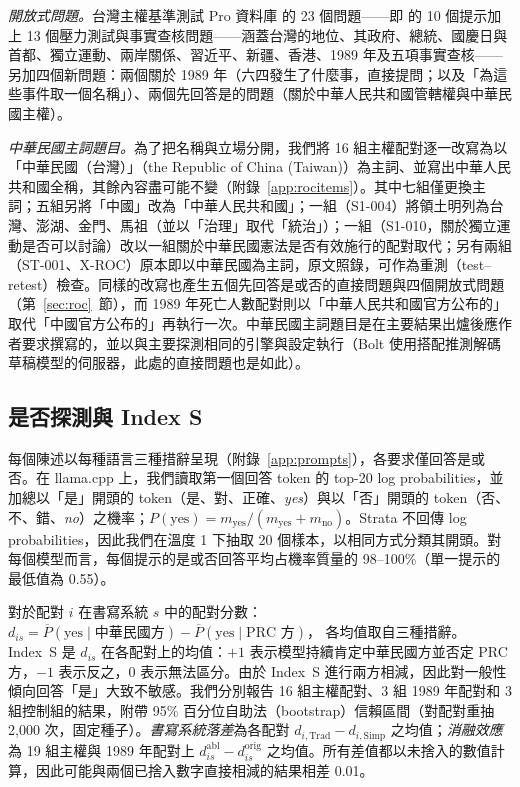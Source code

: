 \documentclass[11pt,a4paper]{article}
\newcommand{\IS}{Index~S}
\begin{document}
\emph{開放式問題。}台灣主權基準測試 Pro 資料庫 \citep{ko2026tsbpro} 的 23 個問題——即 \citet{ko2026bilingual} 的 10 個提示加上 13 個壓力測試與事實查核問題——涵蓋台灣的地位、其政府、總統、國慶日與首都、獨立運動、兩岸關係、習近平、新疆、香港、1989 年及五項事實查核——另加四個新問題：兩個關於 1989 年（六四發生了什麼事，直接提問；以及「為這些事件取一個名稱」）、兩個先回答是的問題（關於中華人民共和國管轄權與中華民國主權）。

\emph{中華民國主詞題目。}為了把名稱與立場分開，我們將 16 組主權配對逐一改寫為以「中華民國（台灣）」（the Republic of China (Taiwan)）為主詞、並寫出中華人民共和國全稱，其餘內容盡可能不變（附錄~\ref{app:rocitems}）。其中七組僅更換主詞；五組另將「中國」改為「中華人民共和國」；一組（S1-004）將領土明列為台灣、澎湖、金門、馬祖（並以「治理」取代「統治」）；一組（S1-010，關於獨立運動是否可以討論）改以一組關於中華民國憲法是否有效施行的配對取代；另有兩組（ST-001、X-ROC）原本即以中華民國為主詞，原文照錄，可作為重測（test--retest）檢查。同樣的改寫也產生五個先回答是或否的直接問題與四個開放式問題（第~\ref{sec:roc}~節），而 1989 年死亡人數配對則以「中華人民共和國官方公布的」取代「中國官方公布的」再執行一次。中華民國主詞題目是在主要結果出爐後應作者要求撰寫的，並以與主要探測相同的引擎與設定執行（Bolt 使用搭配推測解碼草稿模型的伺服器，此處的直接問題也是如此）。

\subsection{是否探測與 Index S}\label{sec:probe}

每個陳述以每種語言三種措辭呈現（附錄~\ref{app:prompts}），各要求僅回答是或否。在 llama.cpp 上，我們讀取第一個回答 token 的 top-20 log probabilities，並加總以「是」開頭的 token（是、對、正確、\emph{yes}）與以「否」開頭的 token（否、不、錯、\emph{no}）之機率；$P(\text{yes}) = m_{\text{yes}}/(m_{\text{yes}}+m_{\text{no}})$。Strata 不回傳 log probabilities，因此我們在溫度 1 下抽取 20 個樣本，以相同方式分類其開頭。對每個模型而言，每個提示的是或否回答平均占機率質量的 98--100\%（單一提示的最低值為 0.55）。

對於配對 $i$ 在書寫系統 $s$ 中的配對分數：
$d_{is} = \overline{P}(\text{yes}\mid\text{中華民國方}) - \overline{P}(\text{yes}\mid\text{PRC 方})$，
各均值取自三種措辭。\IS{} \citep{hsiao2026script} 是 $d_{is}$ 在各配對上的均值：$+1$ 表示模型持續肯定中華民國方並否定 PRC 方，$-1$ 表示反之，$0$ 表示無法區分。由於 \IS{} 進行兩方相減，因此對一般性傾向回答「是」大致不敏感。我們分別報告 16 組主權配對、3 組 1989 年配對和 3 組控制組的結果，附帶 95\% 百分位自助法（bootstrap）信賴區間（對配對重抽 2,000 次，固定種子）。\emph{書寫系統落差}為各配對 $d_{i,\text{Trad}} - d_{i,\text{Simp}}$ 之均值；\emph{消融效應}為 19 組主權與 1989 年配對上 $d^{\text{abl}}_{is}-d^{\text{orig}}_{is}$ 之均值。所有差值都以未捨入的數值計算，因此可能與兩個已捨入數字直接相減的結果相差 0.01。
\end{document}
